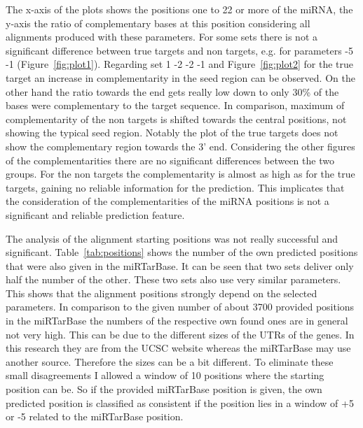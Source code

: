 \documentclass[12pt]{article}
\begin{document}
The x-axis of the plots shows the positions one to 22 or more of the miRNA, the y-axis the ratio of complementary bases at this position considering all alignments produced with these parameters. For some sets there is not a significant difference between true targets and non targets, e.g. for parameters -5 -1 (Figure~\ref{fig:plot1}). Regarding set 1 -2 -2 -1 and Figure~\ref{fig:plot2} for the true target an increase in complementarity in the seed region can be observed. On the other hand the ratio towards the end gets really low down to only 30\% of the bases were complementary to the target sequence. In comparison, maximum of complementarity of the non targets is shifted towards the central positions, not showing the typical seed region. Notably the plot of the true targets does not show the complementary region towards the 3' end. Considering the other figures of the complementarities there are no significant differences between the two groups. For the non targets the complementarity is almost as high as for the true targets, gaining no reliable information for the prediction. This implicates that the consideration of the complementarities of the miRNA positions is not a significant and reliable prediction feature.

The analysis of the alignment starting positions was not really successful and significant. Table~\ref{tab:positions} shows the number of the own predicted positions that were also given in the miRTarBase. It can be seen that two sets deliver only half the number of the other. These two sets also use very similar parameters. This shows that the alignment positions strongly depend on the selected parameters. In comparison to the given number of about 3700 provided positions in the miRTarBase the numbers of the respective own found ones are in general not very high. This can be due to the different sizes of the UTRs of the genes. In this research they are from the UCSC website whereas the miRTarBase may use another source. Therefore the sizes can be a bit different. To eliminate these small disagreements I allowed a window of 10 positions where the starting position can be. So if the provided miRTarBase position is given, the own predicted position is classified as consistent if the position lies in a window of +5 or -5 related to the miRTarBase position. 
\end{document}

